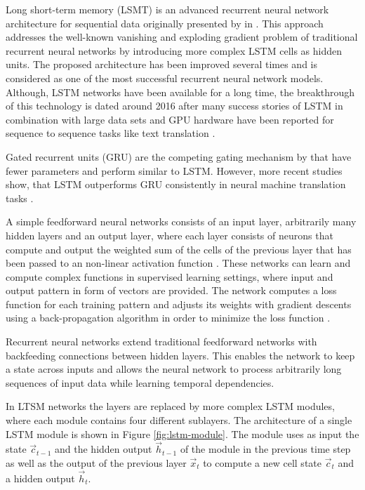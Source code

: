 Long short-term memory (LSMT) is an advanced recurrent neural network architecture for sequential data originally presented by \citeauthor{DBLP:journals/neco/HochreiterS97} in \citeyear{DBLP:journals/neco/HochreiterS97}  \cite{DBLP:journals/neco/HochreiterS97}.
This approach addresses the well-known vanishing and exploding gradient problem \cite{DBLP:conf/icml/PascanuMB13}  of traditional recurrent neural networks by introducing more complex LSTM cells as hidden units.
The proposed architecture has been improved several times \cite{DBLP:journals/neco/GersSC00} \cite {DBLP:journals/tnn/GreffSKSS17} and is considered as one of the most successful recurrent neural network models.
Although, LSTM networks have been available for a long time, the breakthrough of this technology is dated around 2016 after many success stories of LSTM in combination with large data sets and GPU hardware have been reported for sequence to sequence tasks like text translation \cite{DBLP:journals/corr/WuSCLNMKCGMKSJL16}.

Gated recurrent units (GRU) \cite{DBLP:conf/emnlp/ChoMGBBSB14} are the competing gating mechanism by \citeauthor{DBLP:conf/emnlp/ChoMGBBSB14} that have fewer parameters and perform similar to LSTM.
However, more recent studies show, that LSTM outperforms GRU consistently in neural machine translation tasks \cite{DBLP:journals/corr/BritzGLL17}.

A simple feedforward neural networks consists of an input layer, arbitrarily many hidden layers and an output layer, where each layer consists of neurons that compute and output the weighted sum of the cells of the previous layer that has been passed to an non-linear activation function \cite{DBLP:journals/nn/Schmidhuber15}.
These networks can learn and compute complex functions in supervised learning settings, where input and output pattern in form of vectors are provided.
The network computes a loss function for each training pattern and adjusts its weights with gradient descents using a back-propagation algorithm in order to minimize the loss function \cite{rumelhart1986learning}.

Recurrent neural networks extend traditional feedforward networks with backfeeding connections between hidden layers.
This enables the network to keep a state across inputs and allows the neural network to process arbitrarily long sequences of input data while learning temporal dependencies.

In LTSM networks the layers are replaced by more complex LSTM modules, where each module contains four different sublayers.
The architecture of a single LSTM module is shown in Figure \ref{fig:lstm-module}.
The module uses as input the state $\vec{c}_{t-1}$ and the hidden output $\vec{h}_{t-1}$ of the module in the previous time step as well as the output of the previous layer $\vec{x}_t$ to compute a new cell state $\vec{c}_{t}$ and a hidden output $\vec{h}_{t}$.

